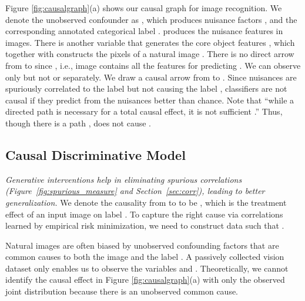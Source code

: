 \documentclass[final]{cvpr}
\begin{document}
Figure \ref{fig:causalgraph}(a) shows our causal graph for image recognition. We denote the unobserved confounder as , which produces nuisance factors , and the corresponding annotated categorical label .  produces the nuisance features  in images. There is another variable  that generates the core object features , which together with  constructs the pixels of a natural image . There is no direct arrow from  to  since , i.e., image  contains all the features for predicting . We can observe only  but not  or  separately.  We draw a causal arrow from  to . Since nuisances  are spuriously correlated to the label but not causing the label , classifiers are not causal if they predict  from the nuisances  better than chance. Note that ``while a directed path is necessary for a total causal effect, it is not sufficient \cite{elements_causal}.'' Thus, though there is a path ,  does not cause .








\subsection{Causal Discriminative Model}\label{sec:dis}

\emph{Generative interventions help in eliminating spurious correlations (Figure~\ref{fig:spurious_measure} and Section~\ref{sec:corr}), leading to better generalization.} We denote the causality from  to  to be , which is the treatment effect of an input image  on label .
To capture the right cause via correlations learned by empirical risk minimization, we need to construct data such that . 









Natural images are often biased by unobserved confounding factors that are common causes to both the image  and the label . A passively collected vision dataset only enables us to observe the variables  and . Theoretically, we cannot identify the causal effect  in Figure \ref{fig:causalgraph}(a) with only the observed joint distribution  because there is an unobserved common cause.
\end{document}
